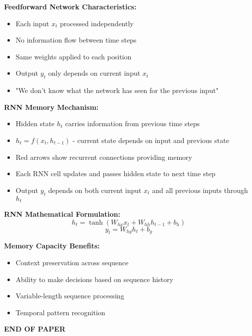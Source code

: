 \documentclass[12pt]{article}
\newcommand{\explanation}[1]{{\color{explanationcolor}#1}}
\begin{document}
\begin{enumerate}[(a)]
    \explanation{
    \textbf{Feedforward Network Characteristics:}
    \begin{itemize}
        \item Each input $x_t$ processed independently
        \item No information flow between time steps
        \item Same weights applied to each position
        \item Output $y_t$ only depends on current input $x_t$
        \item "We don't know what the network has seen for the previous input"
    \end{itemize}
    
    \textbf{RNN Memory Mechanism:}
    \begin{itemize}
        \item Hidden state $h_t$ carries information from previous time steps
        \item $h_t = f(x_t, h_{t-1})$ - current state depends on input and previous state
        \item Red arrows show recurrent connections providing memory
        \item Each RNN cell updates and passes hidden state to next time step
        \item Output $y_t$ depends on both current input $x_t$ and all previous inputs through $h_t$
    \end{itemize}
    
    \textbf{RNN Mathematical Formulation:}
    $$h_t = \tanh(W_{hx} x_t + W_{hh} h_{t-1} + b_h)$$
    $$y_t = W_{hy} h_t + b_y$$
    
    \textbf{Memory Capacity Benefits:}
    \begin{itemize}
        \item Context preservation across sequence
        \item Ability to make decisions based on sequence history
        \item Variable-length sequence processing
        \item Temporal pattern recognition
    \end{itemize}
    }
\end{enumerate}

\vfill
\begin{center}{\bf END OF PAPER}\end{center}
\end{document}

